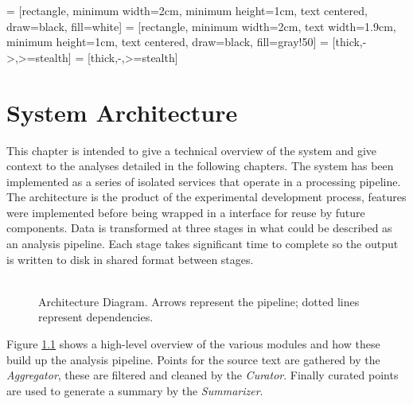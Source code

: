  = [rectangle, minimum width=2cm, minimum height=1cm, text centered, draw=black, fill=white]
 = [rectangle, minimum width=2cm, text width=1.9cm, minimum height=1cm, text centered, draw=black, fill=gray!50]
 = [thick,->,>=stealth]
 = [thick,-,>=stealth]

\chapter{System Architecture\label{chap:system-architecture}}
  This chapter is intended to give a technical overview of the system and give context to the analyses detailed in the following chapters. The system has been implemented as a series of isolated services that operate in a processing pipeline. The architecture is the product of the experimental development process, features were implemented before being wrapped in a interface for reuse by future components. Data is transformed at three stages in what could be described as an analysis pipeline. Each stage takes significant time to complete so the output is written to disk in shared format between stages.

  \begin{figure}[!h]
    \centering
    \caption{\\Architecture Diagram. Arrows represent the pipeline; dotted lines represent dependencies.}
    \label{fig:arch-dia}
  \end{figure}

  Figure \ref{fig:arch-dia} shows a high-level overview of the various modules and how these build up the analysis pipeline. Points for the source text are gathered by the \textit{Aggregator}, these are filtered and cleaned by the \textit{Curator}. Finally curated points are used to generate a summary by the \textit{Summarizer}.


